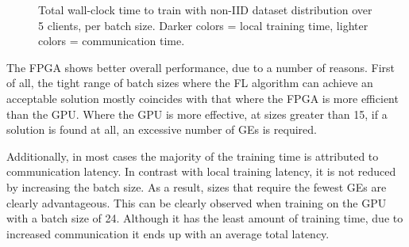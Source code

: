 \begin{figure}[H]
    \caption[ non-IID distribution, total time per GE ]{Total wall-clock time to train with non-IID dataset distribution over 5 clients, per batch size. Darker colors = local training time, lighter colors = communication time. }
    \label{fig: nonIID, total time}
\end{figure}

The FPGA shows better overall performance, due to a number of reasons. First of all, the tight range of batch sizes where the FL algorithm can achieve an acceptable solution mostly coincides with that where the FPGA is more efficient than the GPU. Where the GPU is more effective, at sizes greater than 15, if a solution is found at all, an excessive number of GEs is required. %

Additionally, in most cases the majority of the training time is attributed to communication latency. In contrast with local training latency, it is not reduced by increasing the batch size. As a result, sizes that require the fewest GEs are clearly advantageous. This can be clearly observed when training on the GPU with a batch size of 24. Although it has the least amount of training time, due to increased communication it ends up with an average total latency. %

